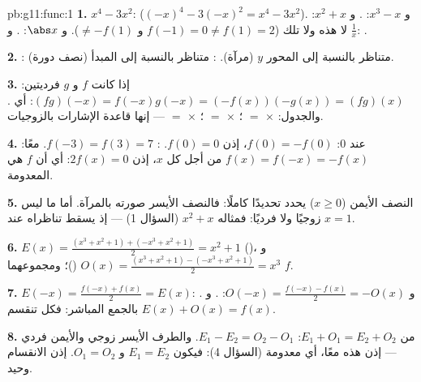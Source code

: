 \begin{solution}{pb:g11:func:1}
\textbf{1.} $x^4 - 3x^2$:  ($(-x)^4 - 3(-x)^2 = x^4 -
3x^2$). و $x^3 - x$: . و $x^2 + x$: لا هذه ولا تلك ($f(-1) = 0 \neq
f(1) = 2$ و $\neq -f(1)$). و $\abs x$: . و $\frac1x$: .

\textbf{2.} :  متناظر بالنسبة إلى المحور $y$
(مرآة). : متناظر بالنسبة إلى المبدأ (نصف دورة).

\textbf{3.} إذا كانت $f$ و $g$ فرديتين:
$(fg)(-x) = f(-x)g(-x) = (-f(x))(-g(x)) = (fg)(x)$: أي .
والجدول:  $\times$  $=$ ؛  $\times$  $=$ ؛
 $\times$  $=$  --- إنها قاعدة الإشارات بالزوجيات.

\textbf{4.}  عند $0$: $f(0) = -f(0)$، إذن $f(0) = 0$. :
$f(-3) = f(3) = 7$.   معًا:
$f(x) = f(-x) = -f(x)$ من أجل كل $x$، إذن $2f(x) = 0$: أي أن $f$ هي
 المعدومة.

\textbf{5.} النصف الأيمن ($x \geq 0$) يحدد 
تحديدًا كاملًا: فالنصف الأيسر صورته بالمرآة. أما ما ليس زوجيًا
ولا فرديًا: فمثاله $x^2 + x$ (السؤال 1) --- إذ يسقط تناظراه عند
$x = 1$.

\textbf{6.} $E(x) = \frac{(x^3 + x^2 + 1) + (-x^3 + x^2 +
1)}{2} = x^2 + 1$ ()، و $O(x) = \frac{(x^3 + x^2 + 1) -
(-x^3 + x^2 + 1)}{2} = x^3$ ()؛ ومجموعهما $f$.

\textbf{7.} $E(-x) = \frac{f(-x) + f(x)}{2} = E(x)$: .
و $O(-x) = \frac{f(-x) - f(x)}{2} = -O(x)$: . و
$E(x) + O(x) = f(x)$ بالجمع المباشر: فكل 
تنقسم.

\textbf{8.} من $E_1 + O_1 = E_2 + O_2$:
$E_1 - E_2 = O_2 - O_1$. والطرف الأيسر زوجي والأيمن
فردي --- إذن هذه   معًا، أي معدومة (السؤال 4):
فيكون $E_1 = E_2$ و $O_1 = O_2$. إذن الانقسام وحيد.


\end{solution}

